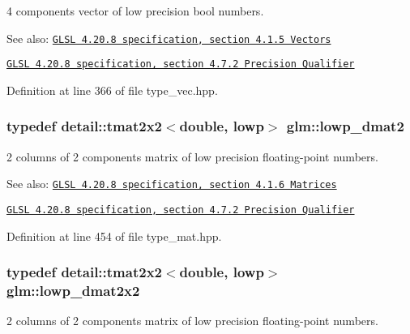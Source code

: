 4 components vector of low precision bool numbers.

\begin{Desc}
\item[See also:]\href{http://www.opengl.org/registry/doc/GLSLangSpec.4.20.8.pdf}{\tt GLSL 4.20.8 specification, section 4.1.5 Vectors} 

\href{http://www.opengl.org/registry/doc/GLSLangSpec.4.20.8.pdf}{\tt GLSL 4.20.8 specification, section 4.7.2 Precision Qualifier} \end{Desc}


Definition at line 366 of file type\_\-vec.hpp.\hypertarget{group__core__precision_g5e08c45dfef867e0326a1eee95060cd0}{
\subsubsection[lowp\_\-dmat2]{\setlength{\rightskip}{0pt plus 5cm}typedef detail::tmat2x2$<$double, lowp$>$ {\bf glm::lowp\_\-dmat2}}}
\label{group__core__precision_g5e08c45dfef867e0326a1eee95060cd0}


2 columns of 2 components matrix of low precision floating-point numbers.

\begin{Desc}
\item[See also:]\href{http://www.opengl.org/registry/doc/GLSLangSpec.4.20.8.pdf}{\tt GLSL 4.20.8 specification, section 4.1.6 Matrices} 

\href{http://www.opengl.org/registry/doc/GLSLangSpec.4.20.8.pdf}{\tt GLSL 4.20.8 specification, section 4.7.2 Precision Qualifier} \end{Desc}


Definition at line 454 of file type\_\-mat.hpp.\hypertarget{group__core__precision_g68b486ff22814c1a3781378513a9fcc0}{
\subsubsection[lowp\_\-dmat2x2]{\setlength{\rightskip}{0pt plus 5cm}typedef detail::tmat2x2$<$double, lowp$>$ {\bf glm::lowp\_\-dmat2x2}}}
\label{group__core__precision_g68b486ff22814c1a3781378513a9fcc0}


2 columns of 2 components matrix of low precision floating-point numbers.

